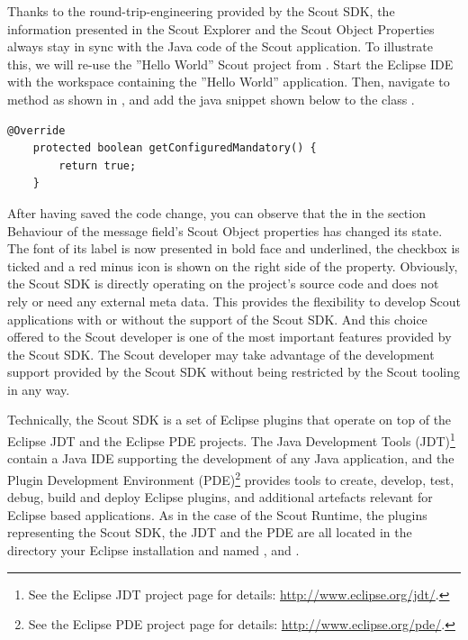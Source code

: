 \documentclass[a4paper,10pt,twoside]{book}
\begin{document}
Thanks to the round-trip-engineering provided by the Scout SDK, the information presented in the Scout Explorer and the Scout Object Properties always stay in sync with the Java code of the Scout application.
To illustrate this, we will re-use the ''Hello World'' Scout project from . 
Start the Eclipse IDE with the workspace containing the ''Hello World'' application.
Then, navigate to method  as shown in , and add the java snippet shown below to the class . 

\begin{lstlisting}[backgroundcolor=\color{white}]
    @Override
    protected boolean getConfiguredMandatory() {
        return true;
    }
\end{lstlisting}

After having saved the code change, you can observe that the  in the section Behaviour of the message field's Scout Object properties has changed its state. 
The font of its label is now presented in bold face and underlined, the checkbox is ticked and a red minus icon is shown on the right side of the property. 
Obviously, the Scout SDK is directly operating on the project's source code and does not rely or need any external meta data. 
This provides the flexibility to develop Scout applications with or without the support of the Scout SDK. 
And this choice offered to the Scout developer is one of the most important features provided by the Scout SDK. 
The Scout developer may take advantage of the development support provided by the Scout SDK without being restricted by the Scout tooling in any way.

Technically, the Scout SDK is a set of Eclipse plugins that operate on top of the Eclipse JDT and the Eclipse PDE projects.
The Java Development Tools (JDT)\footnote{
See the Eclipse JDT project page for details: \url{http://www.eclipse.org/jdt/}.
} 
contain a Java IDE supporting the development of any Java application, 
and the Plugin Development Environment (PDE)\footnote{
See the Eclipse PDE project page for details: \url{http://www.eclipse.org/pde/}.
}
provides tools to create, develop, test, debug, build and deploy Eclipse plugins, and additional artefacts relevant for Eclipse based applications. 
As in the case of the Scout Runtime, the plugins representing the Scout SDK, the JDT and the PDE are all located in the  directory your Eclipse installation and named ,  and  . 
\end{document}
